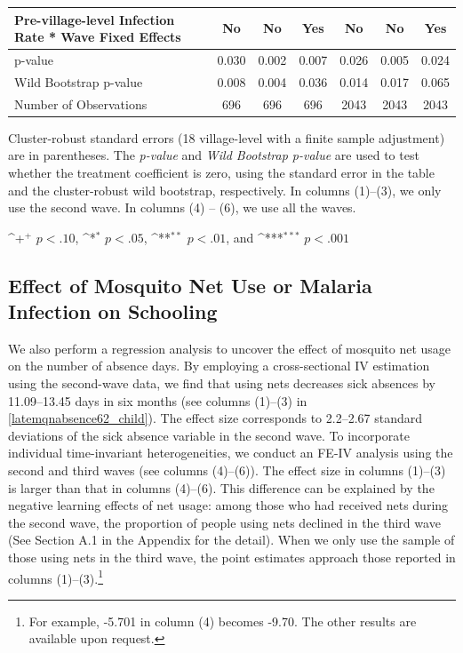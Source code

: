 \documentclass[fleqn,11pt]{article}
\newcommand{\sym}[1]{\rlap{$#1$}}
\def\sym#1{\ifmmode^{#1}\else\(^{#1}\)\fi
}
\begin{document}
\begin{table}[h]
\begin{adjustbox}{max width=\textwidth}
\begin{threeparttable}
\begin{tabular}{l*{6}{c}}
Pre-village-level Infection Rate * Wave Fixed Effects&          No         &          No         &          Yes         &          No         &          No         &         Yes         \\
\hline
p-value  &       0.030         &       0.002         &       0.007         &       0.026         &       0.005         &       0.024          \\
Wild Bootstrap p-value &       0.008         &       0.004         &       0.036         &       0.014         &       0.017         &       0.065     \\
Number of Observations        &         696         &         696         &         696         &        2043         &        2043         &        2043         \\
\hline\hline
\end{tabular}
\begin{tablenotes}
\item Cluster-robust standard errors (18 village-level with a finite sample adjustment) are in parentheses. The \textit{p-value} and \textit{Wild Bootstrap p-value} are used to test whether the treatment coefficient is zero, using the standard error in the table and the cluster-robust wild bootstrap, respectively. In columns (1)--(3), we only use the second wave. In columns (4) -- (6), we use all the waves.
\item \sym{+} \(p<.10\), \sym{*} \(p<.05\), \sym{**} \(p<.01\), and \sym{***} \(p<.001\)
\end{tablenotes}
\end{threeparttable}
\end{adjustbox}
\end{table}


\subsection{Effect of Mosquito Net Use or Malaria Infection on Schooling}
\label{sec:late}
We also perform a regression analysis to uncover the effect of mosquito net usage on the number
of absence days. By employing a cross-sectional IV estimation using the second-wave data, we find that using nets decreases sick absences by 11.09--13.45 days in six months (see columns (1)--(3) in \autoref{latemqnabsence62_child}). The effect size corresponds to 2.2--2.67 standard deviations of the sick absence variable in the second wave. To incorporate individual time-invariant heterogeneities, we conduct an FE-IV analysis using the second and third waves (see columns (4)--(6)). The effect size in columns (1)--(3) is larger than that in columns (4)--(6). This difference can be explained by the negative learning effects of net usage: among those who had received nets during the second wave, the proportion of people using nets declined in the third wave (See Section A.1 in the Appendix for the detail). When we only use the sample of those using nets in the third wave, the point estimates approach those reported in columns (1)--(3).\footnote{For example, -5.701 in column (4) becomes -9.70. The other results are available upon request.}
\end{document}
